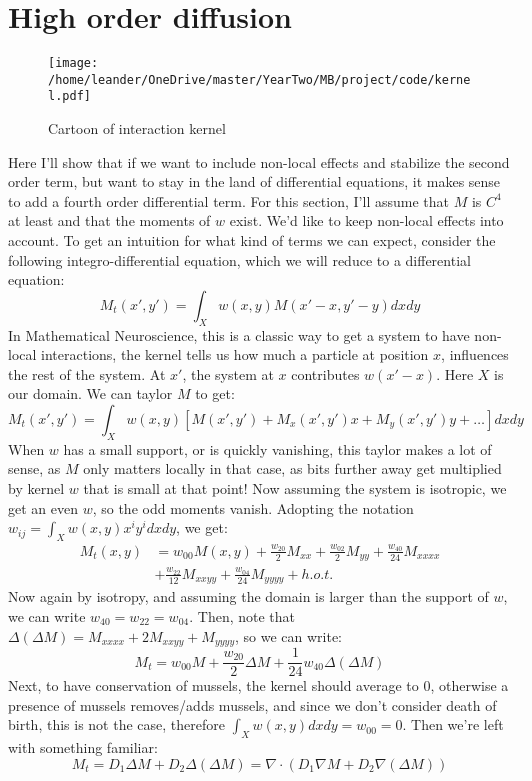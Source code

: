 \documentclass[a4paper]{jpconf}
\begin{document}
\section{High order diffusion}
\begin{figure}[h!]
    \centering
    \texttt{[image: /home/leander/OneDrive/master/YearTwo/MB/project/code/kernel.pdf]}
        
    \caption{Cartoon of interaction kernel}\label{kernel}
\end{figure}
Here I'll show that if we want to include non-local effects and stabilize the second order term, but want to stay in the land of differential equations, it makes sense to add a fourth order differential term. For this section, I'll assume that $M$ is $C^4$ at least and that the moments of $w$ exist.
We'd like to keep non-local effects into account. To get an intuition for what kind of terms we can expect, consider the following integro-differential equation, which we will reduce to a differential equation:
\[
M_t(x',y') = \int_{X}w(x,y)M(x'-x,y'-y)dxdy
\]
In Mathematical Neuroscience, this is a classic way to get a system to have non-local interactions, the kernel tells us how much a particle at position $x$, influences the rest of the system. At $x'$, the system at $x$ contributes $w(x'-x)$. Here $X$ is our domain. We can taylor $M$ to get:
\[
M_t(x',y') = \int_{X}w(x,y)\left[M(x',y')+M_x(x',y')x+M_y(x',y')y+\dots\right]dxdy
\]
When $w$ has a small support, or is quickly vanishing, this taylor makes a lot of sense, as $M$ only matters locally in that case, as bits further away get multiplied by kernel $w$ that is small at that point! Now assuming the system is isotropic, we get an even $w$, so the odd moments vanish. Adopting the notation $w_{ij}=\int_X w(x,y) x^iy^idxdy$, we get:
\[\begin{aligned}M_t(x,y) &= w_{00} M(x,y)+\frac{w_{20}}{2}M_{xx}+\frac{w_{02}}{2}M_{yy}+\frac{w_{40}}{24}M_{xxxx}\\
&+\frac{w_{22}}{12}M_{xxyy}+\frac{w_{04}}{24}M_{yyyy}+h.o.t.
\end{aligned}\]
Now again by isotropy, and assuming the domain is larger than the support of $w$, we can write $w_{40}=w_{22}=w_{04}$. Then, note that $\Delta(\Delta M)=M_{xxxx}+2M_{xxyy}+M_{yyyy}$, so we can write:
\[
M_t = w_{00}M+\frac{w_{20}}{2}\Delta M+\frac{1}{24}w_{40} \Delta(\Delta M)
\]
Next, to have conservation of mussels, the kernel should average to $0$, otherwise a presence of mussels removes/adds mussels, and since we don't consider death of birth, this is not the case, therefore $\int_X w(x,y)dxdy = w_{00}=0$. Then we're left with something familiar:
\[
M_t = D_1\Delta M+D_2\Delta(\Delta M) = \nabla \cdot (D_1\nabla M+D_2\nabla(\Delta M))
\]
\end{document}

